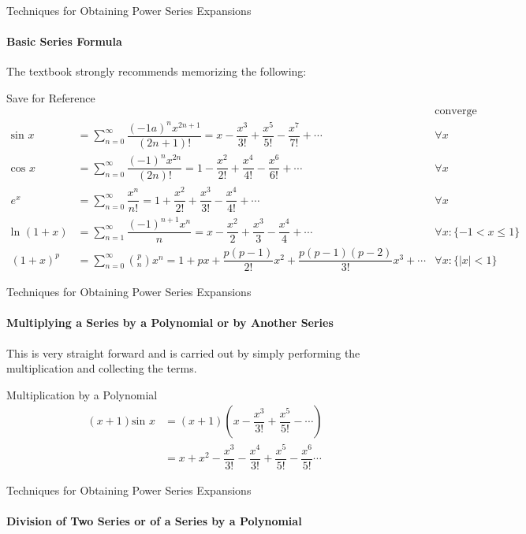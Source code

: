 \documentclass{beamer}
\begin{document}
\begin{frame}{Techniques for Obtaining Power Series Expansions}
	\framesubtitle{Basic Series Formula}
	The textbook strongly recommends memorizing the following:
	\begin{alertblock}{Save for Reference}
	{\tiny\begin{align*}
	& & \mbox{converge} \\
	\mbox{sin\ }x &= \sum\limits_{n=0}^\infty\dfrac{(-1a)^nx^{2n+1}}{(2n+1)!} = x-\dfrac{x^3}{3!}+\dfrac{x^5}{5!}-\dfrac{x^7}{7!}+\cdots & \forall x \\
	\mbox{cos\ }x &= \sum\limits_{n=0}^\infty\dfrac{(-1)^nx^{2n}}{(2n)!} =  1-\dfrac{x^2}{2!}+\dfrac{x^4}{4!}-\dfrac{x^6}{6!}+\cdots & \forall x \\
	e^x &= \sum\limits_{n=0}^\infty\dfrac{x^n}{n!} = 1+\dfrac{x^2}{2!}+\dfrac{x^3}{3!}-\dfrac{x^4}{4!}+\cdots & \forall x \\
	\mbox{ln\ }(1+x) &= \sum\limits_{n=1}^\infty\dfrac{(-1)^{n+1}x^n}{n} = x-\dfrac{x^2}{2}+\dfrac{x^3}{3}-\dfrac{x^4}{4}+\cdots & \forall x:\{-1<x\leq 1\} \\
	(1+x)^p &= \sum\limits_{n=0}^\infty {p\choose n}x^n = 1+px+\dfrac{p(p-1)}{2!}x^2+\dfrac{p(p-1)(p-2)}{3!}x^3+\cdots & \forall x:\{ \lvert x\rvert < 1\}
	\end{align*}
	} %
	\end{alertblock}
\end{frame}
  
\begin{frame}{Techniques for Obtaining Power Series Expansions}
    	\framesubtitle{Multiplying a Series by a Polynomial or by Another Series}
    	This is very straight forward and is carried out by simply performing the multiplication and collecting the terms.
    	\begin{exampleblock}{Multiplication by a Polynomial}
    	\begin{align*}
    	(x+1)\mbox{sin\ } x &= (x+1)\left( x-\dfrac{x^3}{3!}+\dfrac{x^5}{5!}-\cdots\right) \\
    	&= x + x^2 - \dfrac{x^3}{3!}-\dfrac{x^4}{3!}+\dfrac{x^5}{5!}-\dfrac{x^6}{5!}\cdots
    	\end{align*}
    	\end{exampleblock}
\end{frame}
  
\begin{frame}{Techniques for Obtaining Power Series Expansions}
    	\framesubtitle{Division of Two Series or of a Series by a Polynomial}
\end{frame}
  
\end{document}
